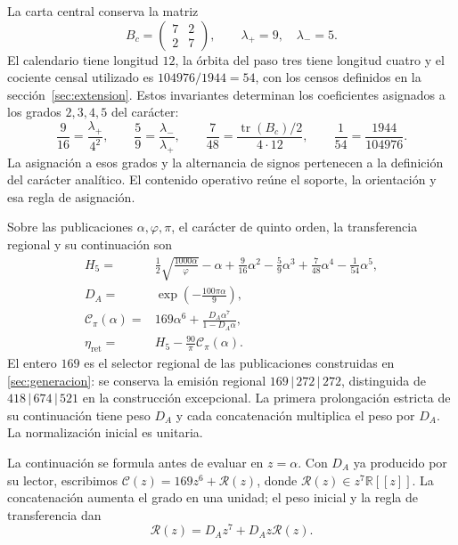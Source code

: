 La carta central conserva la matriz
\[
 B_c=\begin{pmatrix}7&2\\2&7\end{pmatrix},
 \qquad\lambda_+=9,\quad\lambda_-=5.
\]
El calendario tiene longitud \(12\), la órbita del paso tres tiene
longitud cuatro y el cociente censal utilizado es
\(104976/1944=54\), con los censos definidos en la
sección~\ref{sec:extension}. Estos invariantes determinan los coeficientes
asignados a los grados \(2,3,4,5\) del carácter:
\begin{equation}
 \frac9{16}=\frac{\lambda_+}{4^2},\qquad
 \frac59=\frac{\lambda_-}{\lambda_+},\qquad
 \frac7{48}=\frac{\operatorname{tr}(B_c)/2}{4\cdot12},
 \qquad
 \frac1{54}=\frac{1944}{104976}.
 \label{iv:action:coeficientes}
\end{equation}
La asignación a esos grados y la alternancia de signos pertenecen
a la definición del carácter analítico. El contenido operativo
reúne el soporte, la orientación y esa regla de asignación.

\begin{definition}
\label{iv:action:lectores}
Sobre las publicaciones \(\alpha,\varphi,\pi\), el carácter de
quinto orden, la transferencia regional y su continuación son
\begin{align}
 H_5={}&\frac12\sqrt{\frac{1000\alpha}{\varphi}}-\alpha
       +\frac9{16}\alpha^2-\frac59\alpha^3
       +\frac7{48}\alpha^4-\frac1{54}\alpha^5,
       \label{iv:action:h5}\\
 D_A={}&\exp\!\left(-\frac{100\pi\alpha}{9}\right),
       \label{iv:action:da}\\
 \mathcal C_\pi(\alpha)={}&169\alpha^6+
       \frac{D_A\alpha^7}{1-D_A\alpha},
       \label{iv:action:cpi}\\
 \eta_{\mathrm{ret}}={}&H_5-\frac{90}{\pi}\mathcal C_\pi(\alpha).
       \label{iv:action:eta-ret}
\end{align}
El entero \(169\) es el selector regional de las publicaciones
construidas en \ref{sec:generacion}: se conserva la emisión regional
\(169\,|\,272\,|\,272\), distinguida de
\(418\,|\,674\,|\,521\) en la construcción excepcional.
La primera prolongación estricta de su continuación
tiene peso \(D_A\) y cada concatenación multiplica el peso por
\(D_A\). La normalización inicial es unitaria.
\end{definition}

La continuación se formula antes de evaluar en \(z=\alpha\).
Con \(D_A\) ya producido por su lector, escribimos
\(\mathscr C(z)=169z^6+\mathscr R(z)\), donde
\(\mathscr R(z)\in z^7\mathbb R[[z]]\).
La concatenación aumenta el grado en una unidad; el peso inicial
y la regla de transferencia dan
\begin{equation}
 \mathscr R(z)=D_Az^7+D_Az\mathscr R(z).
 \label{iv:action:renovacion}
\end{equation}


